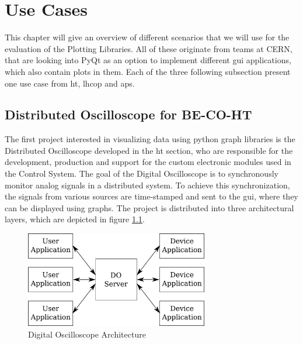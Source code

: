
\chapter{Use Cases}
\label{ch:usecases}

This chapter will give an overview of different scenarios that we will use for
the evaluation of the Plotting Libraries. All of these originate from teams at
CERN, that are looking into PyQt as an option to implement different \gls{gui}
applications, which also contain plots in them. Each of the three following
subsection present one use case from \gls{ht}, \gls{lhcop} and \gls{aps}.


\section{Distributed Oscilloscope for BE-CO-HT}
\label{sec:usecases:becoht}

The first project interested in visualizing data using python graph libraries is
the Distributed Oscilloscope developed in the \gls{ht} section, who are
responsible for the development, production and support for the custom
electronic modules used in the Control System. The goal of the Digital
Oscilloscope is to synchronously monitor analog signals in a distributed system.
To achieve this synchronization, the signals from various sources are
time-stamped and sent to the \gls{gui}, where they can be displayed using
graphs. The project is distributed into three architectural layers, which are
depicted in figure \ref{fig:doarchitecture}.

\begin{figure}[h]
    \centering
    \includegraphics[width=8cm]{resources/img/DoArchitecture}
    \caption{Digital Oscilloscope Architecture}
    \label{fig:doarchitecture}
\end{figure}

